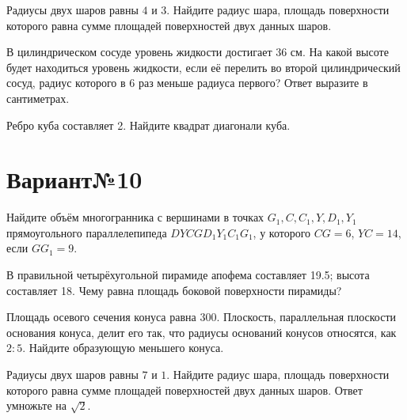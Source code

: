 \documentclass[4apaper]{article}
\begin{document}
\begin{taskBN}{4}
Радиусы двух шаров равны $4$ и $3$. Найдите радиус шара, площадь поверхности которого равна сумме площадей поверхностей двух данных шаров.
\end{taskBN}

\begin{taskBN}{5}
В цилиндрическом сосуде уровень жидкости достигает 36 см. На какой высоте будет находиться уровень жидкости, если её перелить во второй цилиндрический сосуд, радиус которого в 6 раз меньше радиуса первого? Ответ выразите в сантиметрах.
\end{taskBN}

\begin{taskBN}{6}
Ребро куба составляет 2. Найдите квадрат диагонали куба.
\end{taskBN}
\newpage\section*{Вариант№10}

\begin{taskBN}{1}
Найдите объём многогранника с вершинами в точках $G_1,C,C_1,Y,D_1,Y_1$ прямоугольного параллелепипеда $DYCGD_1Y_1C_1G_1$, у которого $CG = 6$, $YC = 14$, если $GG_1=9$. 
\end{taskBN}

\begin{taskBN}{2}
В правильной четырёхугольной пирамиде апофема составляет 19.5; высота составляет 18. Чему равна площадь боковой поверхности пирамиды?
\end{taskBN}

\begin{taskBN}{3}
Площадь осевого сечения конуса равна $300$. Плоскость, параллельная плоскости основания конуса,  делит его так, что радиусы оснований конусов относятся, как $2:5$. Найдите образующую меньшего конуса. 
\end{taskBN}

\begin{taskBN}{4}
Радиусы двух шаров равны $7$ и $1$. Найдите радиус шара, площадь поверхности которого равна сумме площадей поверхностей двух данных шаров. Ответ умножьте на $\sqrt{2}$.
\end{taskBN}
\end{document}
